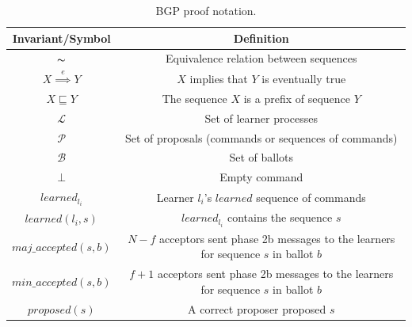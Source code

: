 \documentclass[algorithms,article,accept,moreauthors,pdftex,10pt,a4paper]{Definitions/mdpi}
\begin{document}
\begin{table}[H] 
\small\centering
\caption{{BGP} proof notation.}  %
\label{table:bft_proof} 
\begin{tabular}{cc}
\toprule
\textbf{Invariant/Symbol} & \textbf{Definition} \\
\midrule
$\thicksim$ & Equivalence relation between sequences \\
$X \overset{e}{\implies} Y$ & $X$ implies that $Y$ is eventually true \\
$X \sqsubseteq Y$ & The sequence $X$ is a prefix of sequence $Y$ \\
$\mathcal{L}$ & Set of learner processes \\
$\mathcal{P}$ & Set of proposals (commands or sequences of commands) \\
$\mathcal{B}$ & Set of ballots \\
$\bot$ & Empty command \\
$learned_{l_i}$ & Learner $l_i$'s $learned$ sequence of commands \\
$learned(l_i,s)$ & $learned_{l_i}$ contains the sequence $s$ \\
$maj\_accepted(s,b)$ & $N-f$ acceptors sent phase 2b messages to the learners for sequence $s$ in ballot $b$ \\
$min\_accepted(s,b)$ & $f+1$ acceptors sent phase 2b messages to the learners for sequence $s$ in ballot $b$\\
$proposed(s)$ & A correct proposer proposed $s$ \\
\bottomrule
\end{tabular} 
\end{table}
\end{document}
